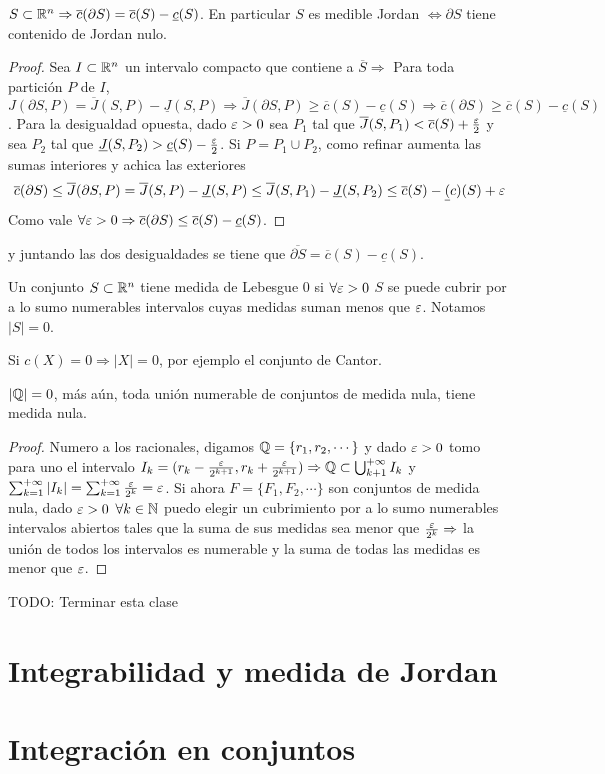 \begin{theorem}
  $S \subset \mathbb{R}^n \Rightarrow \overline{c}(\partial S) = \overline{c}(S) - \underline{c}(S)$. En particular $S$ es medible Jordan $\iff \partial S$ tiene contenido de Jordan nulo.
  \begin{proof}
    Sea $I \subset \mathbb{R}^n$ un intervalo compacto que contiene a $\overline{S} \Rightarrow$ Para toda partición $P$ de $I$, $J(\partial S, P) = \overline{J}(S, P) - \underline{J}(S, P) \Rightarrow \overline{J}(\partial S, P) \geq \overline{c}(S) - \underline{c}(S) \Rightarrow \overline{c}(\partial S) \geq \overline{c}(S) - \underline{c}(S)$. Para la desigualdad opuesta, dado $\varepsilon > 0$ sea $P_1$ tal que $\overline{J}(S, P_1) < \overline{c}(S) + \frac{\varepsilon}{2}$ y sea $P_2$ tal que $\underline{J}(S, P_2) > \underline{c}(S) - \frac{\varepsilon}{2}$. Si $P = P_1 \cup P_2$, como refinar aumenta las sumas interiores y achica las exteriores \begin{equation}
      \overline{c}(\partial S) \leq \overline{J}(\partial S, P) = \overline{J}(S, P) - \underline{J}(S, P) \leq \overline{J}(S, P_1) - \underline{J}(S, P_2) \leq \overline{c}(S) - \underline(c)(S) + \varepsilon
    \end{equation}
    Como vale $\forall \varepsilon > 0 \Rightarrow \overline{c}(\partial S) \leq \overline{c}(S) - \underline{c}(S)$.
  \end{proof} y juntando las dos desigualdades se tiene que $\overline{\partial S} = \overline{c}(S) - \underline{c}(S)$.
\end{theorem}

\begin{definition}
  Un conjunto $S \subset \mathbb{R}^n$ tiene medida de Lebesgue $0$ si $\forall \varepsilon > 0$ $S$ se puede cubrir por a lo sumo numerables intervalos cuyas medidas suman menos que $\varepsilon$. Notamos $|S| = 0$.
\end{definition}

\begin{eg}
  Si $c(X) = 0 \Rightarrow |X| = 0$, por ejemplo el conjunto de Cantor.
\end{eg}

\begin{eg}
  $|\mathbb{Q}| = 0$, más aún, toda unión numerable de conjuntos de medida nula, tiene medida nula.
  \begin{proof}
    Numero a los racionales, digamos $\mathbb{Q} = \{r_1, r_2, \cdots\}$ y dado $\varepsilon > 0$ tomo para uno el intervalo $I_k = (r_k - \frac{\varepsilon}{2^{k+1}}, r_k + \frac{\varepsilon}{2^{k+1}}) \Rightarrow \mathbb{Q} \subset \bigcup_{k + 1}^{+\infty} I_k$ y $\sum_{k = 1}^{+\infty} |I_k| = \sum_{k = 1}^{+\infty} \frac{\varepsilon}{2^k} = \varepsilon$.
    Si ahora $F = \{F_1, F_2, \cdots\}$ son conjuntos de medida nula, dado $\varepsilon > 0$ $\forall k \in \mathbb{N}$ puedo elegir un cubrimiento por a lo sumo numerables intervalos abiertos tales que la suma de sus medidas sea menor que $\frac{\varepsilon}{2^k} \Rightarrow$ la unión de todos los intervalos es numerable y la suma de todas las medidas es menor que $\varepsilon$.
  \end{proof}
\end{eg}

TODO: Terminar esta clase
\section{Integrabilidad y medida de Jordan}

\section{Integración en conjuntos}
